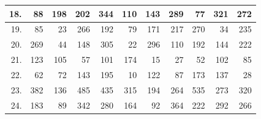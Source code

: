 \begin{table}[H]
{\begin{tabular}{|r|r|r|r|r|r|r|r|r|r|r|}
18.                    & 88                             & 198                             & 202                              & 344                              & 110                              & 143                              & 289                              & 77                               & 321                              & 272                              \\ \hline
19.                    & 85                             & 23                              & 266                              & 192                              & 79                               & 171                              & 217                              & 270                              & 34                               & 235                              \\ \hline
20.                    & 269                            & 44                              & 148                              & 305                              & 22                               & 296                              & 110                              & 192                              & 144                              & 222                              \\ \hline
21.                    & 123                            & 105                             & 57                               & 101                              & 174                              & 15                               & 27                               & 52                               & 102                              & 85                               \\ \hline
22.                    & 62                             & 72                              & 143                              & 195                              & 10                               & 122                              & 87                               & 173                              & 137                              & 28                               \\ \hline
23.                    & 382                            & 136                             & 485                              & 435                              & 315                              & 194                              & 264                              & 535                              & 273                              & 320                              \\ \hline
24.                    & 183                            & 89                              & 342                              & 280                              & 164                              & 92                               & 364                              & 222                              & 292                              & 266                              \\ \hline

\end{tabular}}
\end{table}
